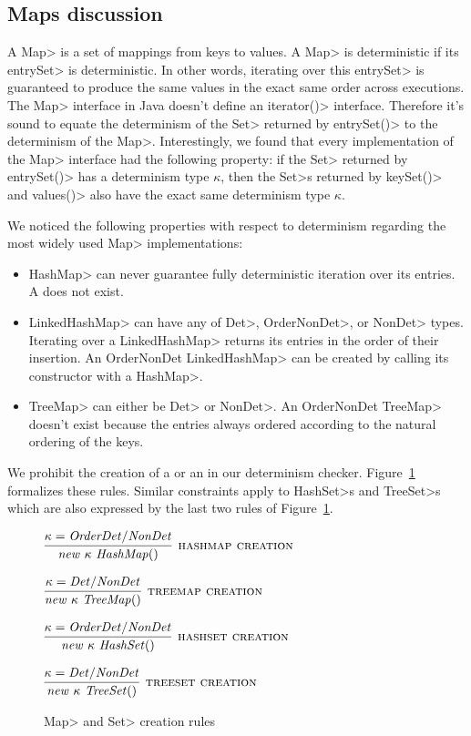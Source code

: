 \subsection{Maps discussion}\label{maps}
A \<Map> is a set of mappings from keys to values. A \<Map> is deterministic if its \<entrySet> is deterministic.
In other words, iterating over this \<entrySet> is guaranteed to produce the same values in the exact same order across executions.
The \<Map> interface in Java doesn't define an \<iterator()> interface. Therefore it's sound to equate the determinism of the \<Set>
returned by \<entrySet()> to the determinism of the \<Map>. Interestingly, we found that every implementation of the \<Map> 
interface had the following property: if the \<Set> returned by \<entrySet()> has a determinism type $\kappa$, then
the \<Set>s returned by \<keySet()> and \<values()> also have the exact same determinism type $\kappa$.

We noticed the following properties with respect to determinism regarding the most widely used \<Map> implementations:
\begin{itemize}
    \item \<HashMap> can never guarantee fully deterministic iteration over its entries. A  does not exist.
    \item \<LinkedHashMap> can have any of \<Det>, \<OrderNonDet>, or \<NonDet> types. Iterating over a \<LinkedHashMap> returns
    its entries in the order of their insertion. An \<OrderNonDet LinkedHashMap> can be created by calling its constructor with a \<HashMap>.
    \item \<TreeMap> can either be \<Det> or \<NonDet>. An \<OrderNonDet TreeMap> doesn't exist because the entries always ordered according
    to the natural ordering of the keys. 
\end{itemize}

We prohibit the creation of a  or an  in our determinism checker.
Figure~\ref{fig-creation-rules} formalizes these rules. Similar constraints apply to \<HashSet>s and \<TreeSet>s which are
also expressed by the last two rules of Figure~\ref{fig-creation-rules}.

\begin{figure}
    $\infer[\textsc{hashmap creation}]{\|new \ \kappa\ HashMap()|}{\kappa = \|OrderDet/NonDet|}$
    
    \bigskip
    
    $\infer[\textsc{treemap creation}]{\|new \ \kappa\ TreeMap()|}{\kappa = \|Det/NonDet|}$
    
    \bigskip
    
    $\infer[\textsc{hashset creation}]{\|new \ \kappa\ HashSet()|}{\kappa = \|OrderDet/NonDet|}$
    
    \bigskip
    
    $\infer[\textsc{treeset creation}]{\|new \ \kappa\ TreeSet()|}{\kappa = \|Det/NonDet|}$
    \caption{\<Map> and \<Set> creation rules}
    \label{fig-creation-rules}
\end{figure}

